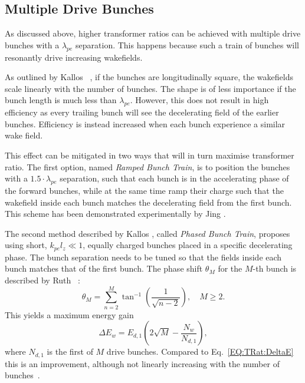 \subsection{Multiple Drive Bunches}
\label{Int:BPI:Multi}

As discussed above, higher transformer ratios can be achieved with multiple drive bunches with a $\lambda_{pe}$ separation. This happens because such a train of bunches will resonantly drive increasing wakefields.

As outlined by Kallos \etal~\cite{kallos:2007}, if the bunches are longitudinally square, the wakefields scale linearly with the number of bunches. The shape is of less importance if the bunch length is much less than $\lambda_{pe}$. However, this does not result in high efficiency as every trailing bunch will see the decelerating field of the earlier bunches. Efficiency is instead increased when each bunch experience a similar wake field.

This effect can be mitigated in two ways that will in turn maximise transformer ratio. The first option, named \textit{Ramped Bunch Train}, is to position the bunches with a $1.5\cdot\lambda_{pe}$ separation, such that each bunch is in the accelerating phase of the forward bunches, while at the same time ramp their charge such that the wakefield inside each bunch matches the decelerating field from the first bunch. This scheme has been demonstrated experimentally by Jing \etal \cite{jing:2006,jing:2007}.

The second method described by Kallos \etal, called \textit{Phased Bunch Train}, proposes using short, $k_{pe}l_{z} \ll 1$, equally charged bunches placed in a specific decelerating phase. The bunch separation needs to be tuned so that the fields inside each bunch matches that of the first bunch. The phase shift $\theta_{M}$ for the $M$-th bunch is described by Ruth \etal~\cite{ruth:1985}:
\begin{equation}
    \theta_{M} = \sum^{M}_{n=2}\tan^{-1}\left(\frac{1}{\sqrt{n-2}}\right),\quad M \geq 2. \label{EQ:TrainPhase}
\end{equation}
This yields a maximum energy gain
\begin{equation}
    \Delta E_{w} = E_{d,1}\left(2\sqrt{M}-\frac{N_{w}}{N_{d,1}}\right), \label{EQ:TrainPhaseMaxE}
\end{equation}
where $N_{d,1}$ is the first of $M$ drive bunches. Compared to Eq.~\ref{EQ:TRat:DeltaE} this is an improvement, although not linearly increasing with the number of bunches~\cite{ruth:1985}.

